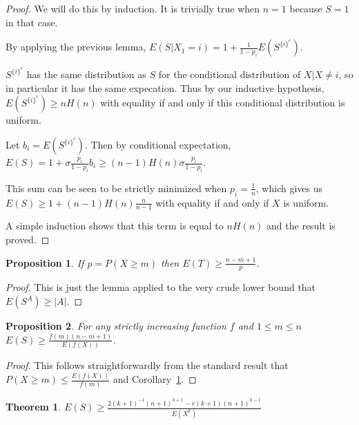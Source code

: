 \documentclass[a4paper]{book}
\newtheorem{proposition}{Proposition}
\newtheorem{theorem}{Theorem}
\begin{document}
\begin{proof}
We will do this by induction.
It is trivially true when \(n = 1\) because \(S = 1\) in that case.

By applying the previous lemma,
\(E(S | X_1 = i) = 1 + \frac{1}{1 - p_i} E(S^{{\{i\}}^c})\).

\(S^{{\{i\}}^c}\) has the same distribution as \(S\) for the conditional distribution of \(X | X \neq i\),
so in particular it has the same expecation.
Thus by our inductive hypothesis,
\(E(S^{{\{i\}}^c}) \geq n H(n)\) with equality if and only if this conditional distribution is uniform.

Let \(b_i = E(S^{{\{i\}}^c})\).
Then by conditional expectation,
\(E(S) = 1 + \sigma \frac{p_i}{1 - p_i} b_i \geq (n - 1) H(n) \sigma \frac{p_i}{1 - p_i} \).

This sum can be seen to be strictly minimized when \(p_i = \frac{1}{n}\),
which gives us \(E(S) \geq 1 + (n - 1) H(n) \frac{n}{n - 1}\) with equality if and only if \(X\) is uniform.

A simple induction shows that this term is equal to \(n H(n)\) and the result is proved.
\end{proof}

\begin{proposition}\label{prop:coupontail}
If \(p = P(X \geq m)\) then \(E(T) \geq \frac{n - m + 1}{p}\).
\end{proposition}

\begin{proof}
This is just the lemma applied to the very crude lower bound that \(E(S^A) \geq |A|\).
\end{proof}

\begin{proposition}\label{prop:couponestimate}
For any strictly increasing function \(f\) and \(1 \leq m \leq n\)
\(E(S) \geq \frac{f(m) (n - m + 1)}{E(f(X))}\).
\end{proposition}

\begin{proof}
This follows straightforwardly from the standard result that \(P(X \geq m) \leq \frac{E(f(X))}{f(m)}\) and Corollary~\ref{prop:coupontail}.
\end{proof}

\begin{theorem}
\(E(S) \geq \frac{2 {(k + 1)}^{-1} {(n + 1)}^{k + 1} - e (k + 1) {(n + 1)}^{k - 1}}{E(X^k)}\)
\end{theorem}
\end{document}

